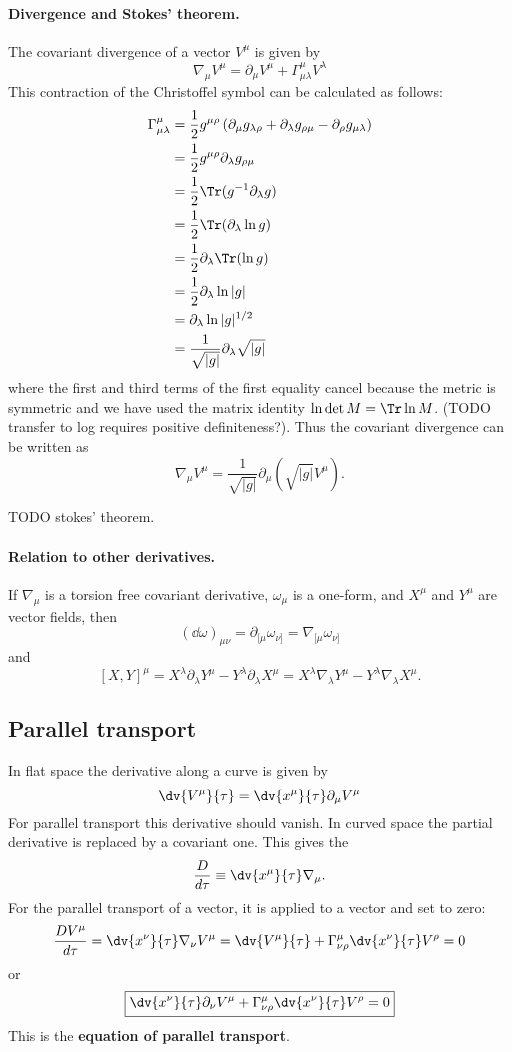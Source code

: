 \paragraph{Divergence and Stokes' theorem.} The covariant divergence of a vector $V^\mu$ is given by
\[ \nabla_\mu V^\mu = \partial_\mu V^\mu + \Gamma^\mu_{\mu\lambda}V^\lambda \]
This contraction of the Christoffel symbol can be calculated as follows:
\begin{align*}
\Gamma^\mu_{\mu\lambda} &= \frac{1}{2}g^{\mu\rho}\left(\partial_\mu g_{\lambda\rho} + \partial_\lambda g_{\rho\mu}-\partial_\rho g_{\mu\lambda}\right) \\
&= \frac{1}{2}g^{\mu\rho}\partial_\lambda g_{\rho\mu} \\
&= \frac{1}{2}\Tr(g^{-1}\partial_\lambda g) \\
&= \frac{1}{2}\Tr(\partial_\lambda \ln g) \\
&= \frac{1}{2} \partial_\lambda \Tr(\ln g) \\
&= \frac{1}{2} \partial_\lambda \ln |g| \\
&= \partial_\lambda \ln |g|^{1/2} \\
&= \frac{1}{\sqrt{|g|}}\partial_\lambda \sqrt{|g|}
\end{align*}
where the first and third terms of the first equality cancel because the metric is symmetric and we have used the matrix identity $\ln\det M=\Tr\ln M$. (TODO transfer to log requires positive definiteness?). Thus the covariant divergence can be written as
\[ \nabla_\mu V^\mu = \frac{1}{\sqrt{|g|}}\partial_\mu \left(\sqrt{|g|}V^\mu\right). \]

TODO stokes' theorem.

\paragraph{Relation to other derivatives.}
If $\nabla_\mu$ is a torsion free covariant derivative, $\omega_\mu$ is a one-form, and $X^\mu$ and $Y^\mu$ are vector fields, then
\[ (\dd{\omega})_{\mu\nu} = \partial_{[\mu}\omega_{\nu]} = \nabla_{[\mu}\omega_{\nu]} \]
and
\[ [X, Y]^\mu = X^\lambda\partial_\lambda Y^\mu - Y^\lambda\partial_\lambda X^\mu = X^\lambda\nabla_\lambda Y^\mu - Y^\lambda\nabla_\lambda X^\mu. \]


\subsection{Parallel transport}
In flat space the derivative along a curve is given by
\[\dv{V^\mu}{\tau} = \dv{x^\mu}{\tau} \partial_\mu V^\mu\]
For parallel transport this derivative should vanish. In curved space the partial derivative is replaced by a covariant one. This gives the 
\[ \frac{D}{d\tau} \equiv \dv{x^\mu}{\tau}\nabla_\mu. \]
For the parallel transport of a vector, it is applied to a vector and set to zero:
\[ \frac{DV^\mu}{d\tau} = \dv{x^\nu}{\tau} \nabla_\nu V^\mu = \dv{V^\mu}{\tau} + \Gamma^\mu_{\nu\rho} \dv{x^\nu}{\tau} V^\rho = 0 \]
or
\[ \boxed{ \dv{x^\nu}{\tau}\partial_\nu V^\mu + \Gamma^\mu_{\nu\rho} \dv{x^\nu}{\tau} V^\rho = 0 } \]
This is the \textbf{equation of parallel transport}.

